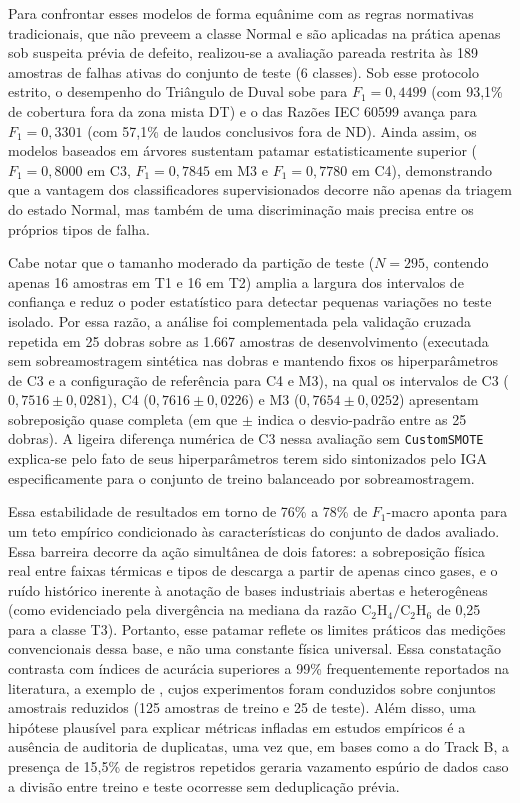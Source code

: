 Para confrontar esses modelos de forma equânime com as regras normativas tradicionais, que não preveem a classe Normal e são aplicadas na prática apenas sob suspeita prévia de defeito, realizou-se a avaliação pareada restrita às 189 amostras de falhas ativas do conjunto de teste (6 classes). Sob esse protocolo estrito, o desempenho do Triângulo de Duval sobe para $F_1 = 0,4499$ (com 93,1\% de cobertura fora da zona mista DT) e o das Razões IEC 60599 avança para $F_1 = 0,3301$ (com 57,1\% de laudos conclusivos fora de ND). Ainda assim, os modelos baseados em árvores sustentam patamar estatisticamente superior ($F_1 = 0,8000$ em C3, $F_1 = 0,7845$ em M3 e $F_1 = 0,7780$ em C4), demonstrando que a vantagem dos classificadores supervisionados decorre não apenas da triagem do estado Normal, mas também de uma discriminação mais precisa entre os próprios tipos de falha.

Cabe notar que o tamanho moderado da partição de teste ($N = 295$, contendo apenas 16 amostras em T1 e 16 em T2) amplia a largura dos intervalos de confiança e reduz o poder estatístico para detectar pequenas variações no teste isolado. Por essa razão, a análise foi complementada pela validação cruzada repetida em 25 dobras sobre as 1.667 amostras de desenvolvimento (executada sem sobreamostragem sintética nas dobras e mantendo fixos os hiperparâmetros de C3 e a configuração de referência para C4 e M3), na qual os intervalos de C3 ($0,7516 \pm 0,0281$), C4 ($0,7616 \pm 0,0226$) e M3 ($0,7654 \pm 0,0252$) apresentam sobreposição quase completa (em que $\pm$ indica o desvio-padrão entre as 25 dobras). A ligeira diferença numérica de C3 nessa avaliação sem \texttt{CustomSMOTE} explica-se pelo fato de seus hiperparâmetros terem sido sintonizados pelo IGA especificamente para o conjunto de treino balanceado por sobreamostragem.

Essa estabilidade de resultados em torno de 76\% a 78\% de $F_1$-macro aponta para um teto empírico condicionado às características do conjunto de dados avaliado. Essa barreira decorre da ação simultânea de dois fatores: a sobreposição física real entre faixas térmicas e tipos de descarga a partir de apenas cinco gases, e o ruído histórico inerente à anotação de bases industriais abertas e heterogêneas (como evidenciado pela divergência na mediana da razão $\text{C}_2\text{H}_4/\text{C}_2\text{H}_6$ de 0,25 para a classe T3). Portanto, esse patamar reflete os limites práticos das medições convencionais dessa base, e não uma constante física universal. Essa constatação contrasta com índices de acurácia superiores a 99\% frequentemente reportados na literatura, a exemplo de , cujos experimentos foram conduzidos sobre conjuntos amostrais reduzidos (125 amostras de treino e 25 de teste). Além disso, uma hipótese plausível para explicar métricas infladas em estudos empíricos é a ausência de auditoria de duplicatas, uma vez que, em bases como a do Track B, a presença de 15,5\% de registros repetidos geraria vazamento espúrio de dados caso a divisão entre treino e teste ocorresse sem deduplicação prévia.

